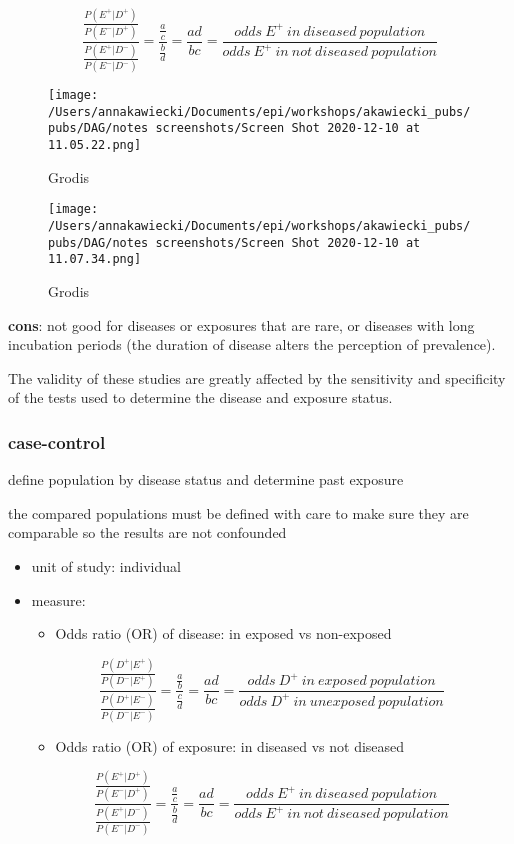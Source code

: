\documentclass[
]{article}
\providecommand{\tightlist}{%
  \setlength{\itemsep}{0pt}\setlength{\parskip}{0pt}}
\begin{document}
\[\frac{\frac{P(E^+|D^+)}{P(E^-|D^+)}}{\frac{P(E^+|D^-)}{P(E^-|D^-)}}=\frac{\frac{a}{c}}{\frac{b}{d}}=\frac{ad}{bc}=\frac{odds\:E^+\:in\:diseased\:population}{odds\:E^+\:in\:not\:diseased\:population}\]

\begin{figure}
\centering
\texttt{[image: /Users/annakawiecki/Documents/epi/workshops/akawiecki\_pubs/pubs/DAG/notes screenshots/Screen Shot 2020-12-10 at 11.05.22.png]}
\caption{Grodis}
\end{figure}

\begin{figure}
\centering
\texttt{[image: /Users/annakawiecki/Documents/epi/workshops/akawiecki\_pubs/pubs/DAG/notes screenshots/Screen Shot 2020-12-10 at 11.07.34.png]}
\caption{Grodis}
\end{figure}

\textbf{cons}: not good for diseases or exposures that are rare, or
diseases with long incubation periods (the duration of disease alters
the perception of prevalence).

The validity of these studies are greatly affected by the sensitivity
and specificity of the tests used to determine the disease and exposure
status.

\hypertarget{case-control}{%
\subsubsection{case-control}\label{case-control}}

define population by disease status and determine past exposure

the compared populations must be defined with care to make sure they are
comparable so the results are not confounded

\begin{itemize}
\item
  unit of study: individual
\item
  measure:

  \begin{itemize}
  \tightlist
  \item
    Odds ratio (OR) of disease: in exposed vs non-exposed
  \end{itemize}

  \[\frac{\frac{P(D^+|E^+)}{P(D^-|E^+)}}{\frac{P(D^+|E^-)}{P(D^-|E^-)}}=\frac{\frac{a}{b}}{\frac{c}{d}}=\frac{ad}{bc}=\frac{odds\:D^+\:in\:exposed\:population}{odds\:D^+\:in\:unexposed\:population}\]

  \begin{itemize}
  \tightlist
  \item
    Odds ratio (OR) of exposure: in diseased vs not diseased
  \end{itemize}

  \[\frac{\frac{P(E^+|D^+)}{P(E^-|D^+)}}{\frac{P(E^+|D^-)}{P(E^-|D^-)}}=\frac{\frac{a}{c}}{\frac{b}{d}}=\frac{ad}{bc}=\frac{odds\:E^+\:in\:diseased\:population}{odds\:E^+\:in\:not\:diseased\:population}\]
\end{itemize}
\end{document}
